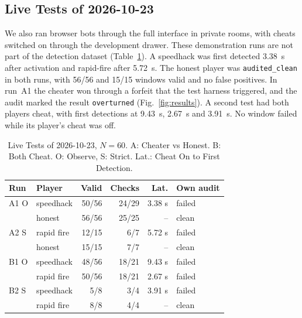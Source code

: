 \documentclass[conference]{IEEEtran}
\newcommand{\status}[1]{\texttt{#1}}
\begin{document}
\subsection{Live Tests of 2026-10-23} %
We also ran browser bots through the full interface in private rooms, with cheats switched on through the development drawer. %
These demonstration runs are not part of the detection dataset (Table~\ref{tab:live}). %
A speedhack was first detected 3.38~s after activation and rapid-fire after 5.72~s. %
The honest player was \status{audited\_clean} in both runs, with 56/56 and 15/15 windows valid and no false positives. %
In run~A1 the cheater won through a forfeit that the test harness triggered, and the audit marked the result \status{overturned} (Fig.~\ref{fig:results}). %
A second test had both players cheat, with first detections at 9.43~s, 2.67~s and 3.91~s. %
No window failed while its player's cheat was off. %

\begin{table}[t]
\centering
\caption{Live Tests of 2026-10-23, $N=60$. A: Cheater vs Honest. B: Both Cheat. O: Observe, S: Strict. Lat.: Cheat On to First Detection.} %
\label{tab:live}
\setlength{\tabcolsep}{3pt}
\footnotesize
\begin{tabular}{@{}llrrrl@{}}
\toprule
Run & Player & Valid & Checks & Lat. & Own audit \\
\midrule
A1 O & speedhack & 50/56 & 24/29 & 3.38 s & failed \\ %
& honest & 56/56 & 25/25 & -- & clean \\ %
A2 S & rapid fire & 12/15 & 6/7 & 5.72 s & failed \\ %
& honest & 15/15 & 7/7 & -- & clean \\ %
B1 O & speedhack & 48/56 & 18/21 & 9.43 s & failed \\ %
& rapid fire & 50/56 & 18/21 & 2.67 s & failed \\ %
B2 S & speedhack & 5/8 & 3/4 & 3.91 s & failed \\ %
& rapid fire & 8/8 & 4/4 & -- & clean \\ %
\bottomrule
\end{tabular}
\end{table}
\end{document}
